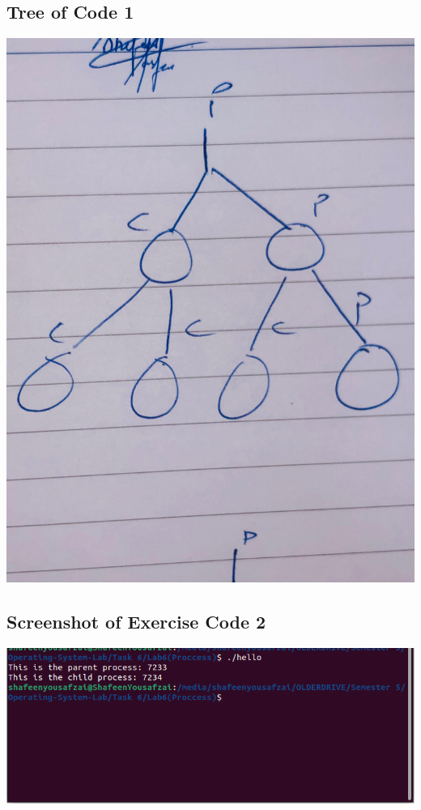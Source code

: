 \documentclass[12pt]{article}
\begin{document}
\subsection{Tree of Code 1}
    \includegraphics[width=\textwidth]{Untitled.jpeg}


\subsection{Screenshot of Exercise Code 2}
\includegraphics[width=\textwidth]{Screenshot from 2024-09-27 05-33-32.png} %
\end{document}
